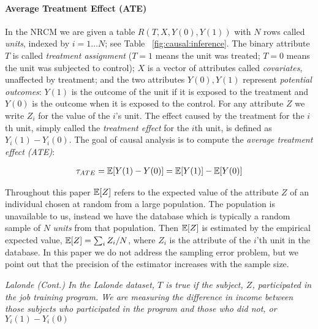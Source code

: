 \vspace{-.3cm}

\paragraph*{Average Treatment Effect (ATE)}
In the NRCM we are given a table $R(T,X,Y(0),Y(1))$ with $N$ rows called {\em units},
indexed by $i=1 \ldots N$; see Table~ \ref{fig:causal:inference}.
The binary attribute $T$ is called {\em treatment assignment}
($T=1$ means the unit was treated; $T=0$ means the unit was subjected to control);
$X$ is a vector of attributes called {\em covariates}, unaffected by treatment;
and the two attributes $Y(0), Y(1)$ represent {\em potential outcomes}:
$Y(1)$ is the outcome of the unit if it is exposed to the treatment and
$Y(0)$ is the outcome when it is exposed to the control.
For any attribute $Z$ we write $Z_i$ for the value of the $i$'s unit.
The effect caused by the treatment for the $i$th unit,
simply called the {\em treatment effect} for the $i$th unit, is defined as $Y_i(1)-Y_i(0)$.
The goal of causal analysis is to compute the {\em average treatment effect (ATE)}:


\vspace{-.4cm}
\begin{align}
  \ate = \E[Y(1)-Y(0)] = \E[Y(1)] - \E[Y(0)] \ignore{=\frac{1}{N} \sum_i (Y_i(1)-Y_i(0))}  \label{eq:ate}
\end{align}


Throughout this paper $\E[Z]$ refers to the expected value of the
attribute $Z$ of an individual chosen at random from a large
population.  The population is unavailable to us, instead we have the
database which is typically a random sample of $N$ {\em units} from
that population.  Then $\E[Z]$ is estimated by the empirical expected
value, $\E[Z] = \sum_i Z_i/N$, where $Z_i$ is the attribute of the
$i$'th unit in the database.  In this paper we do not address the
sampling error problem, but we point out that the precision of the
estimator increases with the sample size.  
\vspace{-.15cm}

\begin{example} \em \label{exa3} Lalonde (Cont.)
In the Lalonde dataset, $T$ is true if the subject, $Z$, participated in the
job training program. We are measuring the difference in income between those subjects
who participated in the program and those who did not, or $Y_i(1)-Y_i(0)$
\end{example}

